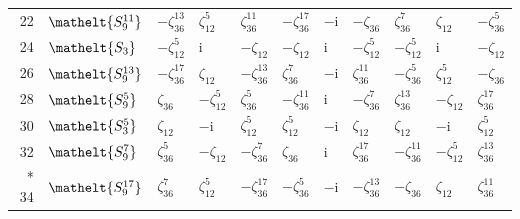 \documentclass[10pt,a4paper]{article}
\numberwithin{equation}{section}
\newcommand{\eltfont}[1]{{\let\sigma\eltsigma\mathelt{#1}}}
\newcommand{\cls}[1]{\eltfont{#1}}
\newcommand{\iunit}{\mathrm{i}}
\newcommand{\rootunity}[1]{\zeta_{#1}}
\begin{document}
{\begin{longtable}{@{}rllllllllll@{}}
22 & $\cls{S_{9}^{11}}$ & $-\rootunity{36}^{13}$ & $\rootunity{12}^{5}$ & $\rootunity{36}^{11}$ & $-\rootunity{36}^{17}$ & $-\iunit{}$ & $-\rootunity{36}$ & $\rootunity{36}^{7}$ & $\rootunity{12}$ & $-\rootunity{36}^{5}$\\
24 & $\cls{S_{3}}$ & $-\rootunity{12}^{5}$ & $\iunit{}$ & $-\rootunity{12}$ & $-\rootunity{12}$ & $\iunit{}$ & $-\rootunity{12}^{5}$ & $-\rootunity{12}^{5}$ & $\iunit{}$ & $-\rootunity{12}$\\
26 & $\cls{S_{9}^{13}}$ & $-\rootunity{36}^{17}$ & $\rootunity{12}$ & $-\rootunity{36}^{13}$ & $\rootunity{36}^{7}$ & $-\iunit{}$ & $\rootunity{36}^{11}$ & $-\rootunity{36}^{5}$ & $\rootunity{12}^{5}$ & $-\rootunity{36}$\\
28 & $\cls{S_{9}^{5}}$ & $\rootunity{36}$ & $-\rootunity{12}^{5}$ & $\rootunity{36}^{5}$ & $-\rootunity{36}^{11}$ & $\iunit{}$ & $-\rootunity{36}^{7}$ & $\rootunity{36}^{13}$ & $-\rootunity{12}$ & $\rootunity{36}^{17}$\\
30 & $\cls{S_{3}^{5}}$ & $\rootunity{12}$ & $-\iunit{}$ & $\rootunity{12}^{5}$ & $\rootunity{12}^{5}$ & $-\iunit{}$ & $\rootunity{12}$ & $\rootunity{12}$ & $-\iunit{}$ & $\rootunity{12}^{5}$\\
32 & $\cls{S_{9}^{7}}$ & $\rootunity{36}^{5}$ & $-\rootunity{12}$ & $-\rootunity{36}^{7}$ & $\rootunity{36}$ & $\iunit{}$ & $\rootunity{36}^{17}$ & $-\rootunity{36}^{11}$ & $-\rootunity{12}^{5}$ & $\rootunity{36}^{13}$\\*
34 & $\cls{S_{9}^{17}}$ & $\rootunity{36}^{7}$ & $\rootunity{12}^{5}$ & $-\rootunity{36}^{17}$ & $-\rootunity{36}^{5}$ & $-\iunit{}$ & $-\rootunity{36}^{13}$ & $-\rootunity{36}$ & $\rootunity{12}$ & $\rootunity{36}^{11}$\\
\bottomrule\end{longtable}}
\end{document}
